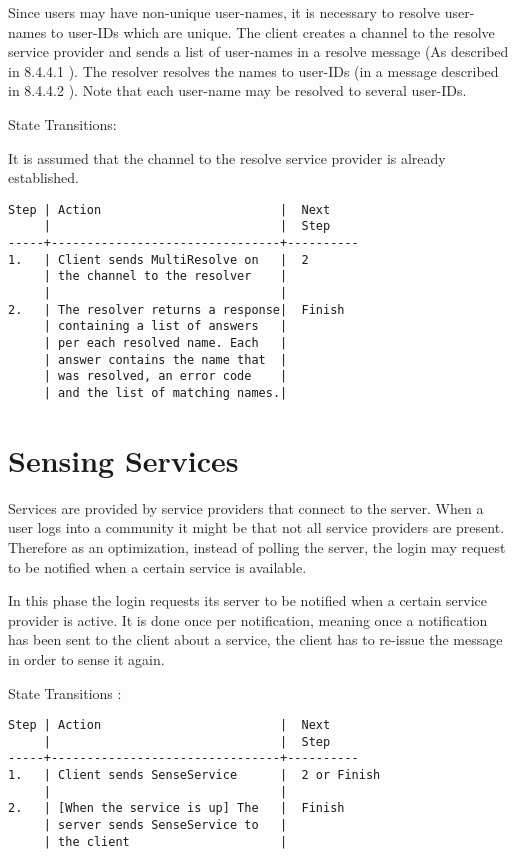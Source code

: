 \documentclass[titlepage,oneside]{book}
\begin{document}
\par{} Since users may have non-unique user-names, it is necessary to
resolve user-names to user-IDs which are unique. The client creates a
channel to the resolve service provider and sends a list of user-names
in a resolve message (As described in 8.4.4.1 ). The resolver resolves
the names to user-IDs (in a message described in 8.4.4.2 ). Note that
each user-name may be resolved to several user-IDs.

\par{} State Transitions:

\par{} It is assumed that the channel to the resolve service provider
is already established.

\begin{verbatim}
Step | Action                         |  Next
     |                                |  Step
-----+--------------------------------+----------
1.   | Client sends MultiResolve on   |  2
     | the channel to the resolver    |
     |                                |
2.   | The resolver returns a response|  Finish
     | containing a list of answers   |
     | per each resolved name. Each   |
     | answer contains the name that  |
     | was resolved, an error code    |
     | and the list of matching names.|
\end{verbatim}

\section{Sensing Services}

\par{} Services are provided by service providers that connect to the
server.  When a user logs into a community it might be that not all
service providers are present. Therefore as an optimization, instead
of polling the server, the login may request to be notified when a
certain service is available.

\par{} In this phase the login requests its server to be notified when
a certain service provider is active. It is done once per
notification, meaning once a notification has been sent to the client
about a service, the client has to re-issue the message in order to
sense it again.

\par{} State Transitions :

\begin{verbatim}
Step | Action                         |  Next
     |                                |  Step
-----+--------------------------------+----------
1.   | Client sends SenseService      |  2 or Finish
     |                                |
2.   | [When the service is up] The   |  Finish
     | server sends SenseService to   |
     | the client                     |
\end{verbatim}
\end{document}

